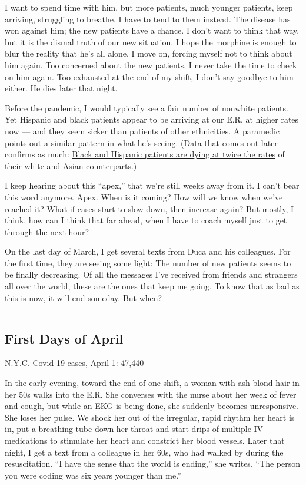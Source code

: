 I want to spend time with him, but more patients, much younger patients,
keep arriving, struggling to breathe. I have to tend to them instead.
The disease has won against him; the new patients have a chance. I don't
want to think that way, but it is the dismal truth of our new situation.
I hope the morphine is enough to blur the reality that he's all alone. I
move on, forcing myself not to think about him again. Too concerned
about the new patients, I never take the time to check on him again. Too
exhausted at the end of my shift, I don't say goodbye to him either. He
dies later that night.

Before the pandemic, I would typically see a fair number of nonwhite
patients. Yet Hispanic and black patients appear to be arriving at our
E.R. at higher rates now --- and they seem sicker than patients of other
ethnicities. A paramedic points out a similar pattern in what he's
seeing. (Data that comes out later confirms as much:
\href{https://www.nytimes3xbfgragh.onion/2020/04/08/nyregion/coronavirus-race-deaths.html}{Black
and Hispanic patients are dying at twice the rates} of their white and
Asian counterparts.)

I keep hearing about this ``apex,'' that we're still weeks away from it.
I can't bear this word anymore. Apex. When is it coming? How will we
know when we've reached it? What if cases start to slow down, then
increase again? But mostly, I think, how can I think that far ahead,
when I have to coach myself just to get through the next hour?

On the last day of March, I get several texts from Duca and his
colleagues. For the first time, they are seeing some light: The number
of new patients seems to be finally decreasing. Of all the messages I've
received from friends and strangers all over the world, these are the
ones that keep me going. To know that as bad as this is now, it will end
someday. But when?

\begin{center}\rule{0.5\linewidth}{\linethickness}\end{center}

\hypertarget{first-days-of-april}{%
\subsection{First Days of April}\label{first-days-of-april}}

N.Y.C. Covid-19 cases, April 1: 47,440

In the early evening, toward the end of one shift, a woman with
ash-blond hair in her 50s walks into the E.R. She converses with the
nurse about her week of fever and cough, but while an EKG is being done,
she suddenly becomes unresponsive. She loses her pulse. We shock her out
of the irregular, rapid rhythm her heart is in, put a breathing tube
down her throat and start drips of multiple IV medications to stimulate
her heart and constrict her blood vessels. Later that night, I get a
text from a colleague in her 60s, who had walked by during the
resuscitation. ``I have the sense that the world is ending,'' she
writes. ``The person you were coding was six years younger than me.''

